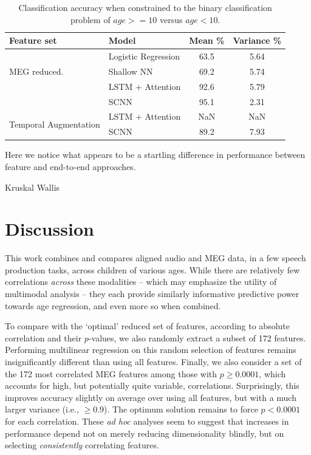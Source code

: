 \documentclass[utf8]{frontiersSCNS} %
\begin{document}
\begin{table}[t]
  \centering
  \label{tab:end2end_results}
  \begin{tabular}{l l | c | c}
    \toprule
    \textbf{Feature set} & \textbf{Model} & \textbf{Mean \%} & \textbf{Variance \%} \\
    \toprule
    \multirow{3}{*}{MEG reduced.}
                         & Logistic Regression    & 63.5 & 5.64  \\ 
                         & Shallow NN             & 69.2 & 5.74  \\
    \midrule
    \multirow{3}{*}{Raw Data}
                         & LSTM + Attention    & 92.6 & 5.79  \\ 
                         & SCNN                & 95.1 & 2.31  \\
    \midrule
    \multirow{3}{*}{Temporal Augmentation}
                         & LSTM + Attention    & NaN & NaN  \\ 
                         & SCNN                & 89.2 & 7.93  \\
    
    \bottomrule
  \end{tabular}
  \caption{Classification accuracy when constrained to the binary classification problem of $age  >=  10$ versus $age < 10$.}
\end{table}

Here we notice what appears to be a startling difference in performance between feature and end-to-end approaches.

Kruskal Wallis 

\section{Discussion}


This work combines and compares aligned audio and MEG data, in a few speech production tasks, across children of various ages. While there are relatively few correlations {\em across} these modalities -- which may emphasize the utility of multimodal analysis -- they each provide similarly informative predictive power towards age regression, and even more so when combined.

To compare with the `optimal' reduced set of features, according to absolute correlation and their $p$-values, we also randomly extract a subset of 172 features. Performing multilinear regression on this random selection of features remains insignificantly different than using all features. Finally, we also consider a set of the 172 most correlated MEG features among those with $p \geq 0.0001$, which accounts for high, but potentially quite variable, correlations. Surprisingly, this improves accuracy slightly on average over using all features, but with a much larger variance (i.e., $\geq 0.9$). The optimum solution remains to force $p<0.0001$ for each correlation. These {\em ad hoc} analyses seem to suggest that increases in performance depend not on merely reducing dimensionality blindly, but on selecting {\em consistently} correlating features. %
\end{document}
